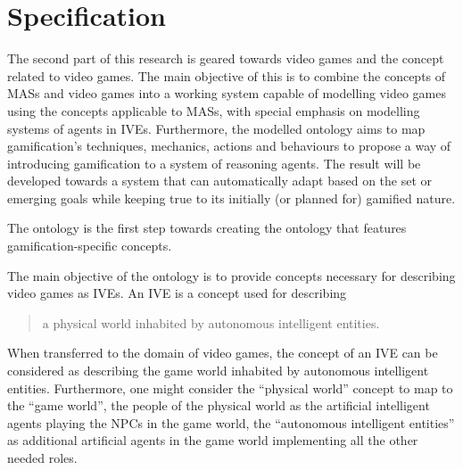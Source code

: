 \chapter{Specification}\label{ch: given specification}


The second part of this research is geared towards video games and the concept related to video games. The main objective of this is to combine the concepts of \acp{MAS} and video games into a working system capable of modelling video games using the concepts applicable to \acp{MAS}, with special emphasis on modelling systems of agents in \acp{IVE}. Furthermore, the modelled \magoga ontology aims to map gamification's techniques, mechanics, actions and behaviours to propose a way of introducing gamification to a system of reasoning agents. The result will be developed towards a system that can automatically adapt based on the set or emerging goals while keeping true to its initially (or planned for) gamified nature. 

The \given ontology is the first step towards creating the \magoga ontology that features gamification-specific concepts. 

The main objective of the \given ontology is to provide concepts necessary for describing video games as \acfp{IVE}.
An \ac{IVE} is a concept used for describing \blockquote[\cite{okresaduric2019MAMbO5NewOntology,rincon2014DevelopingIntelligentVirtual,luck2000ApplyingArtificialIntelligence}]{a physical world inhabited by autonomous intelligent entities.} When transferred to the domain of video games, the concept of an \ac{IVE} can be considered as describing the game world inhabited by autonomous intelligent entities. Furthermore, one might consider the \enquote{physical world} concept to map to the \enquote{game world}, the people of the physical world as the artificial intelligent agents playing the \acp{NPC} in the game world, the \enquote{autonomous intelligent entities} as additional artificial agents in the game world implementing all the other needed roles.

